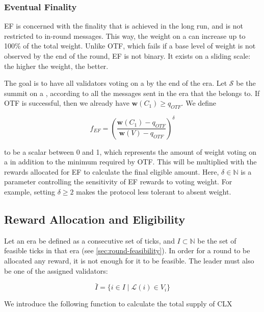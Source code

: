 \subsubsection*{Eventual Finality}
\label{sec:eventual-finality}

EF is concerned with the finality that is achieved in the long run, and is not restricted to in-round messages. This way, the weight on a \PROP can increase up to 100\% of the total weight. Unlike OTF, which fails if a base level of weight is not observed by the end of the round, EF is not binary. It exists on a sliding scale: the higher the weight, the better.

The goal is to have all validators voting on a \PROP by the end of the era. Let $\mathcal{S}$ be the summit on a \PROP, according to all the messages sent in the era that the \PROP belongs to. If OTF is successful, then we already have $\boldsymbol{w}(C_1)\geq q_{OTF}$. We define

\begin{equation}
f_{EF} = \left(\frac{\boldsymbol{w}(C_1) - q_{OTF}}{\boldsymbol{w}(V)-q_{OTF}}\right)^\delta
\end{equation}

to be a scalar between 0 and 1, which represents the amount of weight voting on a \PROP in addition to the minimum required by OTF. This will be multiplied with the rewards allocated for EF to calculate the final eligible amount. Here, $\delta \in \mathbb{N}$ is a parameter controlling the sensitivity of EF rewards to voting weight. For example, setting $\delta \geq 2$ makes the protocol less tolerant to absent weight.

\subsection{Reward Allocation and Eligibility}
\label{sec:reward-allocation-eligibility}

Let an era be defined as a consecutive set of ticks, and $I\subset\mathbb{N}$ be the set of feasible ticks in that era (see \ref{sec:round-feasibility}). In order for a round to be allocated any reward, it is not enough for it to be feasible. The leader must also be one of the assigned validators:

\begin{equation}
\bar{I}=\{i\in I \mid \mathcal{L}(i) \in V_i\}
\end{equation}

We introduce the following function to calculate the total supply of CLX

